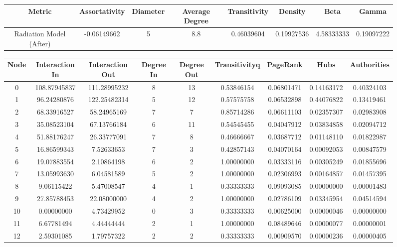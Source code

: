 \documentclass[12pt,a4paper]{thesis}
\begin{document}
\begin{figure}[H]
\centering
\tiny
\begin{tabular}{|c|c|c|c|c|c|c|c|}
\hline Metric & Assortativity & Diameter & Average Degree & Transitivity & Density & Beta & Gamma \\ 
\hline Radiation Model (After) & -0.06149662 & 5 & 8.8 & 0.46039604 & 0.19927536 & 4.58333333 & 0.19097222 \\ 
\hline 
\end{tabular} 
\end{figure}

\begin{figure}[H]
\centering
\tiny
\begin{tabular}{|c|c|c|c|c|c|c|c|c|}
\hline	Node	&	Interaction In	&	Interaction Out	&	Degree In	&	Degree Out	&	Transitivityq	&	PageRank	&	Hubs	&	Authorities	\\
\hline	0	&	108.87945837	&	111.28995232	&	8	&	13	&	0.53846154	&	0.06801471	&	0.14163172	&	0.40324103	\\
\hline	1	&	96.24280876	&	122.25482314	&	5	&	12	&	0.57575758	&	0.06532898	&	0.44076822	&	0.13419461	\\
\hline	2	&	68.33916527	&	58.24965169	&	7	&	7	&	0.85714286	&	0.06611103	&	0.02357307	&	0.02983908	\\
\hline	3	&	35.08523104	&	67.13766184	&	6	&	11	&	0.54545455	&	0.04047912	&	0.03834858	&	0.02094712	\\
\hline	4	&	51.88176247	&	26.33777091	&	7	&	8	&	0.46666667	&	0.03687712	&	0.01148110	&	0.01822987	\\
\hline	5	&	16.86599343	&	7.52633653	&	7	&	3	&	0.42857143	&	0.04070164	&	0.00092053	&	0.00847579	\\
\hline	6	&	19.07883554	&	2.10864198	&	6	&	2	&	1.00000000	&	0.03333116	&	0.00305249	&	0.01855696	\\
\hline	7	&	13.05993630	&	6.04581589	&	5	&	2	&	1.00000000	&	0.02306993	&	0.00164857	&	0.01457395	\\
\hline	8	&	9.06115422	&	5.47008547	&	4	&	1	&	0.33333333	&	0.09093085	&	0.00000000	&	0.00001483	\\
\hline	9	&	27.85788453	&	22.08000000	&	4	&	2	&	1.00000000	&	0.02786109	&	0.03345954	&	0.04514594	\\
\hline	10	&	0.00000000	&	4.73429952	&	0	&	3	&	0.33333333	&	0.00625000	&	0.00000046	&	0.00000000	\\
\hline	11	&	6.67781494	&	4.44444444	&	2	&	1	&	1.00000000	&	0.08489646	&	0.00000077	&	0.00000001	\\
\hline	12	&	2.59301085	&	1.79757322	&	2	&	2	&	0.33333333	&	0.00909570	&	0.00000236	&	0.00000405	\\

\end{tabular}
\end{figure}
\end{document}
